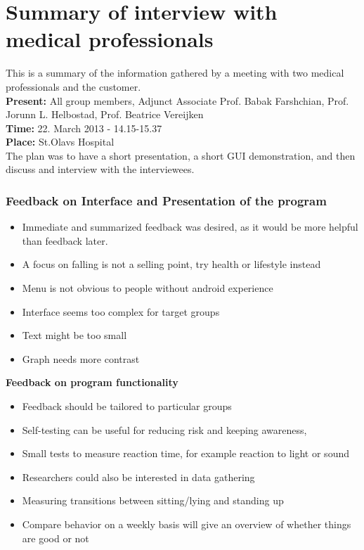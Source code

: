 \section{Summary of interview with medical professionals}
This is a summary of the information gathered by a meeting with two medical professionals and the customer.\\
\textbf{Present:} All group members, Adjunct Associate Prof. Babak Farshchian, Prof. Jorunn L. Helbostad, Prof. Beatrice Vereijken \\
\textbf{Time:} 22. March 2013 - 14.15-15.37\\
\textbf{Place:} St.Olavs Hospital\\
The plan was to have a short presentation, a short GUI demonstration, and then discuss and interview with the interviewees. \\
\subsubsection*{Feedback on Interface and Presentation of the program}
\begin{itemize}
\item Immediate and summarized feedback was desired, as it would be more helpful than feedback later.
\item A focus on falling is not a selling point, try health or lifestyle instead
\item Menu is not obvious to people without android experience
\item Interface seems too complex for target groups
\item Text might be too small
\item Graph needs more contrast 

\end{itemize}

\textbf{Feedback on program functionality}
\begin{itemize}
\item Feedback should be tailored to particular groups
\item Self-testing can be useful for reducing risk and keeping awareness,
\item Small tests to measure reaction time, for example reaction to light or sound
\item Researchers could also be interested in data gathering
\item Measuring transitions between sitting/lying and standing up
\item Compare behavior on a weekly basis will give an overview of whether things are good or not
\end{itemize}

